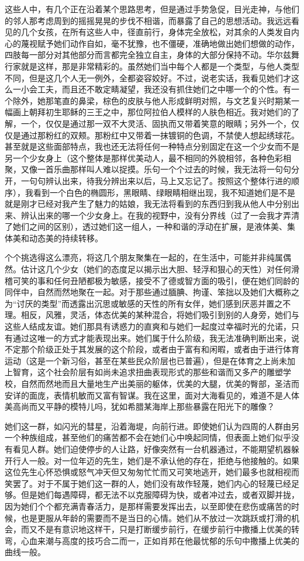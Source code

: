 \par 这些人中，有几个正在沿着某个思路思考，但是通过手势急促，目光走神，与他们的邻人那考虑周到的摇摇晃晃的步伐不相谐，而暴露了自己的思想活动。我远远看见的几个女孩，在所有这些人中，径直前行，身体完全放松，对其余的人类发自内心的蔑视赋予她们动作自如，毫不犹豫，也不僵硬，准确地做出她们想做的动作，四肢每一部分对其他部分而言都完全独立自主，身体的大部分保持不动。华尔兹舞行家就是这样，那是非常精彩的。虽然她们当中每个人都是一个类型，与他人类型不同，但是这几个人无一例外，全都姿容姣好。不过，说老实话，我看见她们才这么一小会工夫，而且还不敢定睛凝望，我还没有抓住她们之中哪一个的个性。有一个除外，她那笔直的鼻梁，棕色的皮肤与他人形成鲜明对照，与文艺复兴时期某一幅画上朝拜初生耶稣的三王之中，那位阿拉伯人模样的人肤色相近。我对她们的了解，一个，仅仅是通过那一双不大灵活、固执而又带着笑意的眼睛；另外一个，仅仅是通过那粉红的双颊。那粉红中又带着一抹镀铜的色调，不禁使人想起绣球花。甚至就是这些面部特点，我也还无法将任何一种特点分别固定在这一个少女而不是另一个少女身上（这个整体是那样优美动人，最不相同的外貌相邻，各种色彩相聚，又像一首乐曲那样叫人难以捉摸。乐句一个个过去的时候，我无法将一句句分开，一句句辨认出来，待我分辨出来以后，马上又忘记了。按照这个整体行进的顺序），我看到一个白色的椭圆形，黑眼睛、绿眼睛相继出现，我不知道她们是不是就是刚才已经对我产生了魅力的姑娘，我无法将看到的东西归到我从他人中分别出来、辨认出来的哪一个少女身上。在我的视野中，没有分界线（过了一会我才弄清了她们之间的区别），透过她们这一组人，一种和谐的浮动在扩展，是液体美、集体美和动态美的持续转移。
\par 个个挑选得这么漂亮，将这几个朋友聚集在一起的，在生活中，可能并非纯属偶然。估计这几个少女（她们的态度足以揭示出大胆、轻浮和狠心的天性）对任何滑稽可笑的事和任何丑陋都极为敏感，接受不了德或智方面的吸引，便在她们同龄的同伴中，自然而然地聚在一起。对于那些通过腼腆、拘谨、笨拙以及她们大概称之为“讨厌的类型”而透露出沉思或敏感的天性的所有女伴，她们感到厌恶并置之不理。相反，风雅，灵活，体态优美的某种混合，将她们吸引到别的人身旁，她们与这些人结成友谊。她们那具有诱惑力的直爽和与她们一起度过幸福时光的允诺，只有通过这唯一的方式才能表现出来。她们属于什么阶级，我无法准确判断出来，说不定那个阶级正处于其发展的这个阶段，或者由于富有和闲暇，或者由于进行体育运动（这是一个新习俗，甚至在某些民众阶层也已普遍），但是在体育之上尚未加上智育，这个社会阶层有如尚未追求扭曲表现形式的那些和谐而又多产的雕塑学校，自然而然地而且大量地生产出美丽的躯体，优美的大腿，优美的臀部，圣洁而安详的面庞，表情机敏而又富有智谋。我在这里，面对大海看见的，难道不是人体美高尚而又平静的模特儿吗，犹如希腊某海岸上那些暴露在阳光下的雕像？
\par 她们这一群，如闪光的彗星，沿着海堤，向前行进。即使她们认为四周的人群由另一个种族组成，甚至他们的痛苦都不会在她们心中唤起同情，但表面上她们似乎没有看见人群。她们迫使停步的人让路，好像突然有一台机器通过，不能期望机器躲开行人一般。对一位年迈的先生，她们是不承认他的存在，拒绝与他接触的。如果这位先生心怀恐惧或怒气冲天但又匆匆忙忙而又可笑地逃开，她们最多也就相视而笑罢了。对于不属于她们这一群的人，她们没有故作轻蔑，她们内心的轻蔑已经足够。但是她们每遇障碍，都无法不以克服障碍为快，或者冲过去，或者双脚并拢，因为她们个个都充满青春活力，是那样需要发挥出去，以至即使在悲伤或痛苦的时候，也是更服从年龄的需要而不是当日的心情。她们从不放过一次跳跃或打滑的机会，而又不是有意识地这样干，只是打断缓步前行，在缓步前行中撒播上优美的转弯，心血来潮与高度的技巧合二而一，正如肖邦在他最忧郁的乐句中撒播上优美的曲线一般。
